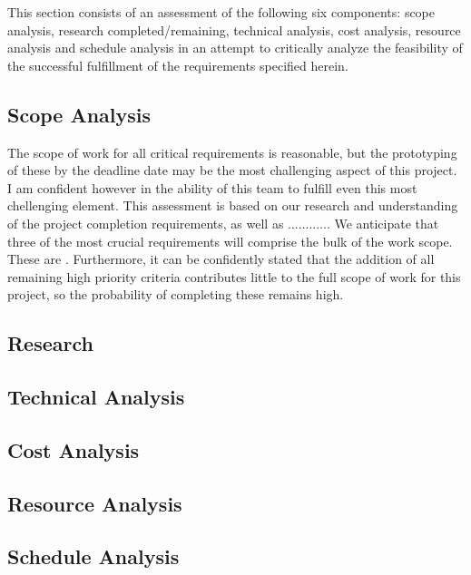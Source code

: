 This section consists of an assessment of the following six components: scope analysis, research completed/remaining, technical analysis, cost analysis, resource analysis and schedule analysis in an attempt to critically analyze the feasibility of the successful fulfillment of the requirements specified herein.
\subsection{Scope Analysis}
The scope of work for all critical requirements is reasonable, but the prototyping of these by the deadline date may be the most challenging aspect of this project. I am confident however in the ability of this team to fulfill even this most chellenging element. This assessment is based on our research and understanding of the project completion requirements, as well as ............ We anticipate that three of the most crucial requirements will comprise the bulk of the work scope. These are{ }. Furthermore, it can be confidently stated that the addition of all remaining high priority criteria contributes little to the full scope of work for this project, so the probability of completing these remains high.
\subsection{Research}

\subsection{Technical Analysis}

\subsection{Cost Analysis}

\subsection{Resource Analysis}

\subsection{Schedule Analysis}
